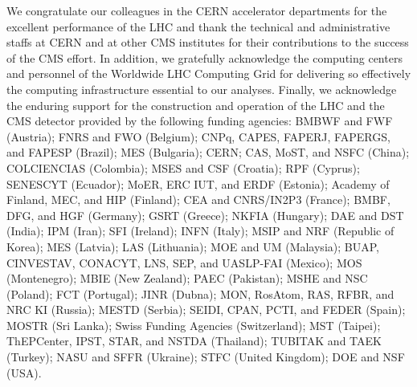 \documentclass[11pt,twoside,a4paper,cmspaper]{cms-tdr}
\begin{document}

\begin{acknowledgments}
We congratulate our colleagues in the CERN accelerator departments for the excellent performance of the LHC and thank the technical and administrative staffs at CERN and at other CMS institutes for their contributions to the success of the CMS effort. In addition, we gratefully acknowledge the computing centers and personnel of the Worldwide LHC Computing Grid for delivering so effectively the computing infrastructure essential to our analyses. Finally, we acknowledge the enduring support for the construction and operation of the LHC and the CMS detector provided by the following funding agencies: BMBWF and FWF (Austria); FNRS and FWO (Belgium); CNPq, CAPES, FAPERJ, FAPERGS, and FAPESP (Brazil); MES (Bulgaria); CERN; CAS, MoST, and NSFC (China); COLCIENCIAS (Colombia); MSES and CSF (Croatia); RPF (Cyprus); SENESCYT (Ecuador); MoER, ERC IUT, and ERDF (Estonia); Academy of Finland, MEC, and HIP (Finland); CEA and CNRS/IN2P3 (France); BMBF, DFG, and HGF (Germany); GSRT (Greece); NKFIA (Hungary); DAE and DST (India); IPM (Iran); SFI (Ireland); INFN (Italy); MSIP and NRF (Republic of Korea); MES (Latvia); LAS (Lithuania); MOE and UM (Malaysia); BUAP, CINVESTAV, CONACYT, LNS, SEP, and UASLP-FAI (Mexico); MOS (Montenegro); MBIE (New Zealand); PAEC (Pakistan); MSHE and NSC (Poland); FCT (Portugal); JINR (Dubna); MON, RosAtom, RAS, RFBR, and NRC KI (Russia); MESTD (Serbia); SEIDI, CPAN, PCTI, and FEDER (Spain); MOSTR (Sri Lanka); Swiss Funding Agencies (Switzerland); MST (Taipei); ThEPCenter, IPST, STAR, and NSTDA (Thailand); TUBITAK and TAEK (Turkey); NASU and SFFR (Ukraine); STFC (United Kingdom); DOE and NSF (USA).
%

\end{acknowledgments}
\end{document}
